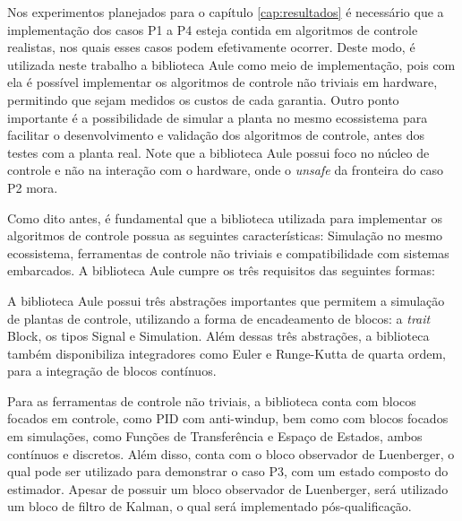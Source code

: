 Nos experimentos planejados para o capítulo \ref{cap:resultados} é necessário que a implementação dos casos P1 a P4 esteja contida em algoritmos de controle realistas, nos quais esses casos podem efetivamente ocorrer. Deste modo, é utilizada neste trabalho a biblioteca Aule como meio de implementação, pois com ela é possível implementar os algoritmos de controle não triviais em hardware, permitindo que sejam medidos os custos de cada garantia. Outro ponto importante é a possibilidade de simular a planta no mesmo ecossistema para facilitar o desenvolvimento e validação dos algoritmos de controle, antes dos testes com a planta real. Note que a biblioteca Aule possui foco no núcleo de controle e não na interação com o hardware, onde o \textit{unsafe} da fronteira do caso P2 mora.

Como dito antes, é fundamental que a biblioteca utilizada para implementar os algoritmos de controle possua as seguintes características: Simulação no mesmo ecossistema, ferramentas de controle não triviais e compatibilidade com sistemas embarcados. A biblioteca Aule cumpre os três requisitos das seguintes formas:

A biblioteca Aule possui três abstrações importantes que permitem a simulação de plantas de controle, utilizando a forma de encadeamento de blocos: a \textit{trait} Block, os tipos Signal e Simulation. Além dessas três abstrações, a biblioteca também disponibiliza integradores como Euler e Runge-Kutta de quarta ordem, para a integração de blocos contínuos.

Para as ferramentas de controle não triviais, a biblioteca conta com blocos focados em controle, como \ac{PID} com anti-windup, bem como com blocos focados em simulações, como Funções de Transferência e Espaço de Estados, ambos contínuos e discretos. Além disso, conta com o bloco observador de Luenberger, o qual pode ser utilizado para demonstrar o caso P3, com um estado composto do estimador. Apesar de possuir um bloco observador de Luenberger, será utilizado um bloco de filtro de Kalman, o qual será implementado pós-qualificação.


